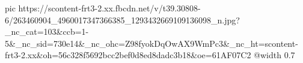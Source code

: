  
 
 
 
 

\ifcmt
  pic https://scontent-frt3-2.xx.fbcdn.net/v/t39.30808-6/263460904_4960017347366385_1293432669109136098_n.jpg?_nc_cat=103&ccb=1-5&_nc_sid=730e14&_nc_ohc=Z98fyokDqOwAX9WmPc3&_nc_ht=scontent-frt3-2.xx&oh=56c328f5692bcc2bef0d8ed8dadc3b18&oe=61AF07C2
  @width 0.7
\fi
